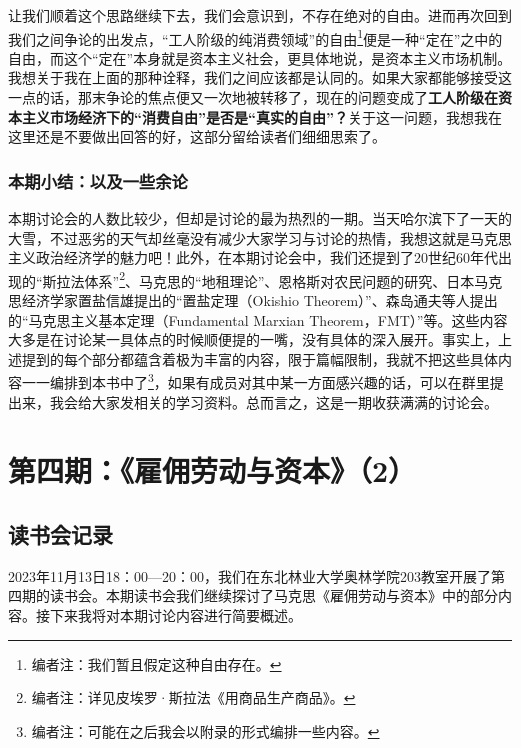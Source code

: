 \documentclass[a4paper,twoside,12pt,AutoFakeBold]{ctexart}
\begin{document}
让我们顺着这个思路继续下去，我们会意识到，不存在绝对的自由。进而再次回到我们之间争论的出发点，“工人阶级的纯消费领域”的自由\footnote{编者注：我们暂且假定这种自由存在。}便是一种“定在”之中的自由，而这个“定在”本身就是资本主义社会，更具体地说，是资本主义市场机制。我想关于我在上面的那种诠释，我们之间应该都是认同的。如果大家都能够接受这一点的话，那末争论的焦点便又一次地被转移了，现在的问题变成了\textbf{工人阶级在资本主义市场经济下的“消费自由”是否是“真实的自由”？}关于这一问题，我想我在这里还是不要做出回答的好，这部分留给读者们细细思索了。

\subsubsection{本期小结：以及一些余论}
本期讨论会的人数比较少，但却是讨论的最为热烈的一期。当天哈尔滨下了一天的大雪，不过恶劣的天气却丝毫没有减少大家学习与讨论的热情，我想这就是马克思主义政治经济学的魅力吧！此外，在本期讨论会中，我们还提到了20世纪60年代出现的“斯拉法体系”\footnote{编者注：详见皮埃罗·斯拉法《用商品生产商品》。}、马克思的“地租理论”、恩格斯对农民问题的研究、日本马克思经济学家置盐信雄提出的“置盐定理（Okishio Theorem）”、森岛通夫等人提出的“马克思主义基本定理（Fundamental Marxian Theorem，FMT）”等。这些内容大多是在讨论某一具体点的时候顺便提的一嘴，没有具体的深入展开。事实上，上述提到的每个部分都蕴含着极为丰富的内容，限于篇幅限制，我就不把这些具体内容一一编排到本书中了\footnote{编者注：可能在之后我会以附录的形式编排一些内容。}，如果有成员对其中某一方面感兴趣的话，可以在群里提出来，我会给大家发相关的学习资料。总而言之，这是一期收获满满的讨论会。
\newpage
\section{第四期：《雇佣劳动与资本》（2）}
\subsection{读书会记录}
2023年11月13日18：00—20：00，我们在东北林业大学奥林学院203教室开展了第四期的读书会。本期读书会我们继续探讨了马克思《雇佣劳动与资本》中的部分内容。接下来我将对本期讨论内容进行简要概述。
\end{document}
